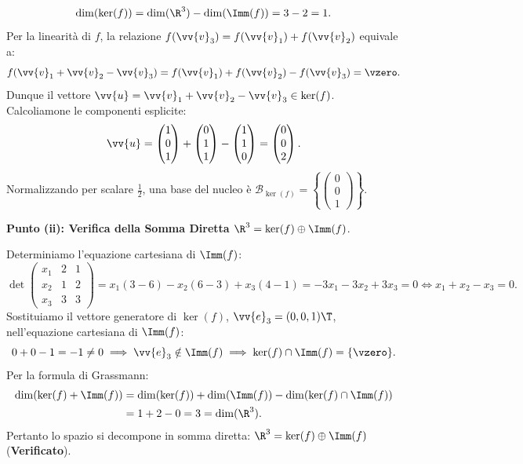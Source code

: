 \begin{dimostrazione}
\begin{equation}
    \dim(\ker(f)) = \dim(\R^3) - \dim(\Imm(f)) = 3 - 2 = 1.
\end{equation}
Per la linearità di $f$, la relazione $f(\vv{v}_3) = f(\vv{v}_1) + f(\vv{v}_2)$ equivale a:
\begin{equation}
    f(\vv{v}_1 + \vv{v}_2 - \vv{v}_3) = f(\vv{v}_1) + f(\vv{v}_2) - f(\vv{v}_3) = \vzero.
\end{equation}
Dunque il vettore $\vv{u} = \vv{v}_1 + \vv{v}_2 - \vv{v}_3 \in \ker(f)$. Calcoliamone le componenti esplicite:
\begin{equation}
    \vv{u} = \begin{pmatrix} 1 \\ 0 \\ 1 \end{pmatrix} + \begin{pmatrix} 0 \\ 1 \\ 1 \end{pmatrix} - \begin{pmatrix} 1 \\ 1 \\ 0 \end{pmatrix} = \begin{pmatrix} 0 \\ 0 \\ 2 \end{pmatrix}.
\end{equation}
Normalizzando per scalare $\frac{1}{2}$, una base del nucleo è $\mathcal{B}_{\ker(f)} = \left\{ \begin{pmatrix} 0 \\ 0 \\ 1 \end{pmatrix} \right\}$.

\textbf{Punto (ii): Verifica della Somma Diretta $\R^3 = \ker(f) \oplus \Imm(f)$}.

Determiniamo l'equazione cartesiana di $\Imm(f)$:
\begin{equation}
    \det \begin{pmatrix} x_1 & 2 & 1 \\ x_2 & 1 & 2 \\ x_3 & 3 & 3 \end{pmatrix} = x_1(3 - 6) - x_2(6 - 3) + x_3(4 - 1) = -3x_1 - 3x_2 + 3x_3 = 0 \iff x_1 + x_2 - x_3 = 0.
\end{equation}
Sostituiamo il vettore generatore di $\ker(f)$, $\vv{e}_3 = (0, 0, 1)\T$, nell'equazione cartesiana di $\Imm(f)$:
\begin{equation}
    0 + 0 - 1 = -1 \neq 0 \implies \vv{e}_3 \notin \Imm(f) \implies \ker(f) \cap \Imm(f) = \{\vzero\}.
\end{equation}
Per la formula di Grassmann:
\begin{align}
    \dim(\ker(f) + \Imm(f)) &= \dim(\ker(f)) + \dim(\Imm(f)) - \dim(\ker(f) \cap \Imm(f)) \notag \\
    &= 1 + 2 - 0 = 3 = \dim(\R^3).
\end{align}
Pertanto lo spazio si decompone in somma diretta: $\R^3 = \ker(f) \oplus \Imm(f)$ (\textbf{Verificato}).
\end{dimostrazione}

